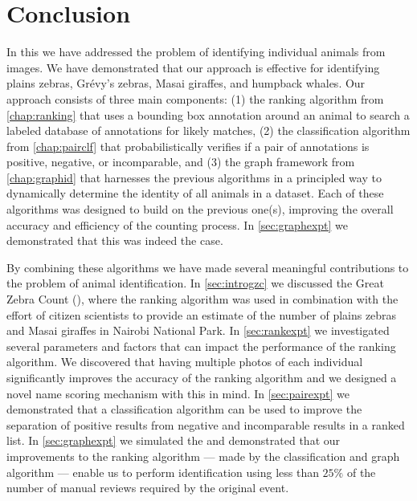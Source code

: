 \begin{comment}
    ./texfix.py --fpaths chapter6-conclusion.tex --outline --asmarkdown --numlines=99 -w
    fixtex --fpaths chapter6-conclusion.tex --outline --asmarkdown --numlines=999 --shortcite
\end{comment}

\chapter{Conclusion}\label{chap:conclusion} 

    In this \thesis{} we have addressed the problem of identifying individual animals from images.
    We have demonstrated that our approach is effective for identifying plains zebras, Grévy's zebras, Masai
      giraffes, and humpback whales.
    Our approach consists of three main components:
    (1) the ranking algorithm from \cref{chap:ranking} that uses a bounding box annotation around an animal to
      search a labeled database of annotations for likely matches,
    (2) the classification algorithm from \cref{chap:pairclf} that probabilistically verifies if a pair of
      annotations is positive, negative, or incomparable, and
    (3) the graph framework from \cref{chap:graphid} that harnesses the previous algorithms in a principled way
      to dynamically determine the identity of all animals in a dataset.
    Each of these algorithms was designed to build on the previous one(s), improving the overall accuracy and
      efficiency of the counting process.
    In \cref{sec:graphexpt} we demonstrated that this was indeed the case.

    By combining these algorithms we have made several meaningful contributions to the problem of animal
      identification.
    In \cref{sec:introgzc} we discussed the Great Zebra Count (\GZC{}), where the ranking algorithm was used in
      combination with the effort of citizen scientists to provide an estimate of the number of plains zebras and
      Masai giraffes in Nairobi National Park.
    In \cref{sec:rankexpt} we investigated several parameters and factors that can impact the performance of the
      ranking algorithm.
    We discovered that having multiple photos of each individual significantly improves the accuracy of the
      ranking algorithm and we designed a novel name scoring mechanism with this in mind.
    In \cref{sec:pairexpt} we demonstrated that a classification algorithm can be used to improve the separation
      of positive results from negative and incomparable results in a ranked list.
    In \cref{sec:graphexpt} we simulated the \GZC{} and demonstrated that our improvements to the ranking
      algorithm --- made by the classification and graph algorithm --- enable us to perform identification using
      less than $25\percent$ of the number of manual reviews required by the original event.

